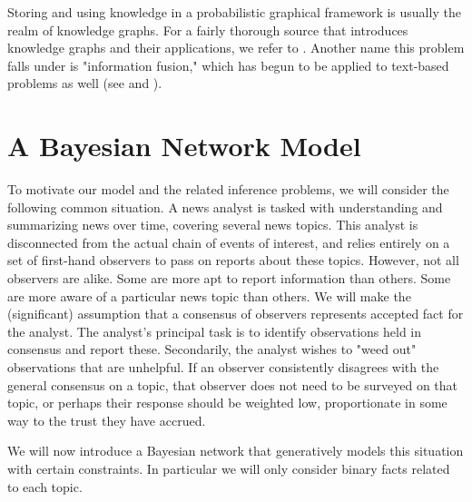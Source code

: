 \documentclass{amsart}
\theoremstyle{plain}
\numberwithin{equation}{section}
\begin{document}
Storing and using knowledge in a probabilistic graphical framework is
usually the realm of knowledge graphs. For a fairly thorough source that
introduces knowledge graphs and their applications, we refer to \cite%
{hogan2021knowledge}. Another name this problem falls under is "information
fusion," which has begun to be applied to text-based problems as well (see 
\cite{levchuk2015probabilistic} and \cite{radev2000common}).

\section{A Bayesian Network Model}

To motivate our model and the related inference problems, we will consider
the following common situation. A news analyst is tasked with understanding
and summarizing news over time, covering several news topics. This analyst
is disconnected from the actual chain of events of interest, and relies
entirely on a set of first-hand observers to pass on reports about these
topics. However, not all observers are alike. Some are more apt to report
information than others. Some are more aware of a particular news topic than
others. We will make the (significant) assumption that a consensus of
observers represents accepted fact for the analyst. The analyst's principal
task is to identify observations held in consensus and report these.
Secondarily, the analyst wishes to "weed out" observations that are
unhelpful. If an observer consistently disagrees with the general consensus
on a topic, that observer does not need to be surveyed on that topic, or
perhaps their response should be weighted low, proportionate in some way to
the trust they have accrued.

We will now introduce a Bayesian network that generatively models this
situation with certain constraints. In particular we will only consider
binary facts related to each topic.
\end{document}
